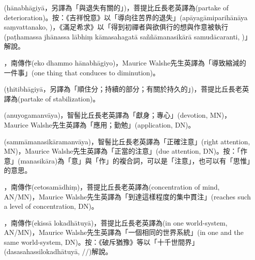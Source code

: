 \startitemgroup[noteitems]
\item{}(hānabhāgiyā，另譯為「與退失有關的」)，菩提比丘長老英譯為(partake of deterioration)。按：《吉祥悅意》以「導向往苦界的退失」(apāyagāmiparihānāya saṃvattanako, )，《滿足希求》以「得到初禪者與欲俱行的想與作意被執行(paṭhamassa jhānassa lābhiṃ kāmasahagatā saññāmanasikārā samudācaranti, )」解說。
\item{}，南傳作(eko dhammo hānabhāgiyo)，Maurice Walshe先生英譯為「導致縮減的一件事」(one thing that conduces to diminution)。
\stopitemgroup

\startitemgroup[noteitems]
\item{}(ṭhitibhāgiyā，另譯為「順住分；持續的部分；有關於持久的」)，菩提比丘長老英譯為(partake of stabilization)。
\stopitemgroup

\startitemgroup[noteitems]
\item{}(anuyogamanvāya)，智髻比丘長老英譯為「獻身；專心」(devotion, MN)，Maurice Walshe先生英譯為「應用；勤勉」(application, DN)。
\stopitemgroup

\startitemgroup[noteitems]
\item{}(sammāmanasikāramanvāya)，智髻比丘長老英譯為「正確注意」(right attention, MN)，Maurice Walshe先生英譯為「正當的注意」(due attention, DN)。按：「作意」(manasikāra)為「意」與「作」的複合詞，可以是「注意」，也可以有「思惟」的意思。
\stopitemgroup

\startitemgroup[noteitems]
\item{}，南傳作(cetosamādhiṃ)，菩提比丘長老英譯為(concentration of mind, AN/MN)，Maurice Walshe先生英譯為「到達這樣程度的集中貫注」(reaches such a level of concentration, DN)。
\stopitemgroup

\startitemgroup[noteitems]
\item{}，南傳作(ekissā lokadhātuyā)，菩提比丘長老英譯為(in one world-system, AN/MN)，Maurice Walshe先生英譯為「一個相同的世界系統」(in one and the same world-system, DN)。按：《破斥猶豫》等以「十千世間界」(dasasahassilokadhātuyā, //)解說。
\stopitemgroup

